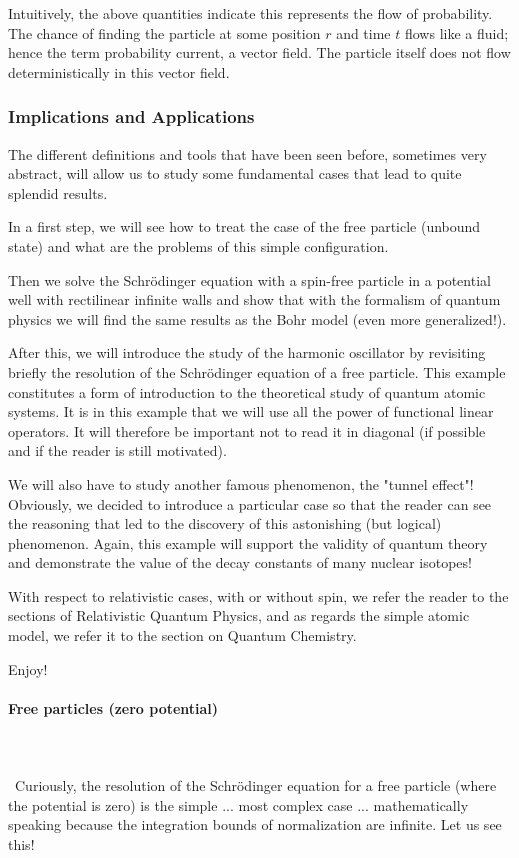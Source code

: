 	Intuitively, the above quantities indicate this represents the flow of probability. The chance of finding the particle at some position $r$ and time $t$ flows like a fluid; hence the term probability current, a vector field. The particle itself does not flow deterministically in this vector field.
	
	\subsubsection{Implications and Applications}
	The different definitions and tools that have been seen before, sometimes very abstract, will allow us to study some fundamental cases that lead to quite splendid results.

	In a first step, we will see how to treat the case of the free particle (unbound state) and what are the problems of this simple configuration.

	Then we solve the Schrödinger equation with a spin-free particle in a potential well with rectilinear infinite walls and show that with the formalism of quantum physics we will find the same results as the Bohr model (even more generalized!).

	After this, we will introduce the study of the harmonic oscillator by revisiting briefly the resolution of the Schrödinger equation of a free particle. This example constitutes a form of introduction to the theoretical study of quantum atomic systems. It is in this example that we will use all the power of functional linear operators. It will therefore be important not to read it in diagonal (if possible and if the reader is still motivated).

	We will also have to study another famous phenomenon, the "tunnel effect"! Obviously, we decided to introduce a particular case so that the reader can see the reasoning that led to the discovery of this astonishing (but logical) phenomenon. Again, this example will support the validity of quantum theory and demonstrate the value of the decay constants of many nuclear isotopes!

	With respect to relativistic cases, with or without spin, we refer the reader to the sections of Relativistic Quantum Physics, and as regards the simple atomic model, we refer it to the section on Quantum Chemistry.

	Enjoy!
	
	\paragraph{Free particles (zero potential)}\label{free particles}\mbox{}\\\\\
	Curiously, the resolution of the Schrödinger equation for a free particle (where the potential is zero) is the simple ... most complex case ... mathematically speaking because the integration bounds of normalization are infinite. Let us see this!

